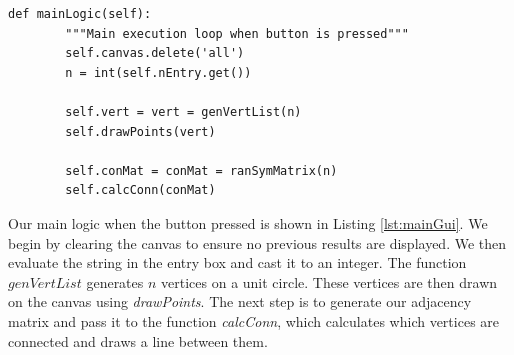 \begin{lstlisting}[caption={Main GUI Button Logic}, label=lst:mainGui,firstnumber=33]
    def mainLogic(self):
        """Main execution loop when button is pressed"""
        self.canvas.delete('all')
        n = int(self.nEntry.get())
        
        self.vert = vert = genVertList(n)
        self.drawPoints(vert)
        
        self.conMat = conMat = ranSymMatrix(n)
        self.calcConn(conMat)
\end{lstlisting}\noindent
Our main logic when the button pressed is shown in Listing \ref{lst:mainGui}. We begin by clearing the canvas to ensure no previous results are displayed. We then evaluate the string in the entry box and cast it to an integer. The function $genVertList$ generates $n$ vertices on a unit circle. These vertices are then drawn on the canvas using \emph{drawPoints}. The next step is to generate our adjacency matrix and pass it to the function \emph{calcConn}, which calculates which vertices are connected and draws a line between them.


